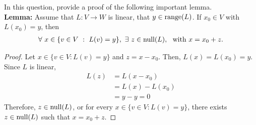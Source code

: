 \begin{question}\label{que:LemmaGenericSols}
	\normalfont
	
	In this question, provide a proof of the following important lemma. \\
	
	\textbf{Lemma:} Assume that $L:V\to W$ is linear, that $y\in\textnormal{range}(L)$. If $x_0\in V$ with $L(x_0)=y$, then 
	\begin{align*}
		\forall\ x\in\{ v\in V\ :\ L(v)=y \},\ \exists\ z\in \textnormal{null}(L),\ \ \text{with}\ x=x_0+z.
	\end{align*}
\end{question}

\begin{proof}
    \renewcommand{\qedsymbol}{$\blacksquare$}
    Let $x\in\{v\in V:L(v)=y\}$ and $z=x-x_0$.
    Then, $L(x)=L(x_0)=y$.
    Since $L$ is linear, 
    \[
        \begin{aligned}
            L(z)
            &= L(x-x_0)\\
            &= L(x)-L(x_0)\\
            &= y-y = 0
        \end{aligned}
    \]
    Therefore, $z\in\textnormal{null}(L)$, or for every $x\in\{v\in V:L(v)=y\}$, there exists $z\in\textnormal{null}(L)$ such that $x=x_0+z$.
\end{proof}